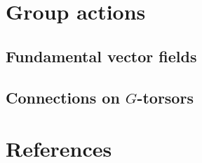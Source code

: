 \documentclass{article}
\begin{document}
\section{Group actions}
  \subsection{Fundamental vector fields}
  \subsection{Connections on $G$-torsors}


\section{References}
\printbibliography
\end{document}
